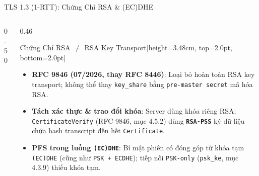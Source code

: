 \documentclass[aspectratio=169, 10pt]{beamer}
\begin{document}
\begin{frame}{TLS 1.3 (1-RTT): Chứng Chỉ RSA \& (EC)DHE}
\begin{columns}[T]
\begin{column}{0.50\textwidth}
\begin{uetcard}[height=3.48cm, top=2.0pt, bottom=2.0pt, sharp corners, arc=0pt]
			\end{uetcard}
		\end{column}

		\begin{column}{0.46\textwidth}
			\begin{accentcard}[uetblue]{Chứng Chỉ RSA $\neq$ RSA Key Transport}[height=3.48cm, top=2.0pt, bottom=2.0pt]
				\setlength{\leftmargini}{10pt}
				\begin{itemize}\setlength{\itemsep}{1.2pt}\setlength{\topsep}{0pt}\fontsize{5.95pt}{7.2pt}\selectfont
					\item \textbf{RFC 9846 (07/2026, thay RFC 8446)}: Loại bỏ hoàn toàn RSA key transport; không thể thay \texttt{key\_share} bằng \texttt{pre-master secret} mã hóa RSA.
					\item \textbf{Tách xác thực \& trao đổi khóa}: Server dùng khóa riêng RSA; \texttt{CertificateVerify} (RFC 9846, mục 4.5.2) dùng \textbf{\texttt{RSA-PSS}} ký dữ liệu chứa hash transcript đến hết \texttt{Certificate}.
					\item \textbf{PFS trong luồng \texttt{(EC)DHE}}: Bí mật phiên có đóng góp từ khóa tạm \texttt{(EC)DHE} (cũng như \texttt{PSK + ECDHE}); tiếp nối \texttt{PSK-only} (\texttt{psk\_ke}, mục 4.3.9) thiếu khóa tạm.
				\end{itemize}
			\end{accentcard}
		\end{column}
	\end{columns}
	\vspace{0.07cm}


\end{frame}
\end{document}
